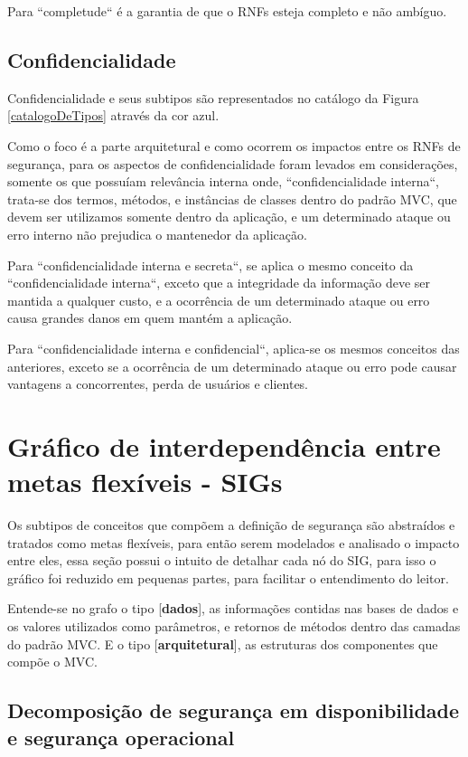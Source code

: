 Para ``completude`` é a garantia de que o RNFs esteja completo e não ambíguo.

\subsection{Confidencialidade}

Confidencialidade e seus subtipos são representados no catálogo da Figura \ref{catalogoDeTipos} através da cor azul. 

Como o foco é a parte arquitetural e como ocorrem os impactos entre os RNFs de segurança, para os aspectos de confidencialidade foram levados em considerações, somente os que possuíam relevância interna onde, ``confidencialidade interna``, trata-se dos termos, métodos, e instâncias de classes dentro do padrão MVC, que devem ser utilizamos somente dentro da aplicação, e um determinado ataque ou erro interno não prejudica o mantenedor da aplicação.

Para ``confidencialidade interna e secreta``, se aplica o mesmo conceito da ``confidencialidade interna``, exceto que a integridade da informação deve ser mantida a qualquer custo, e a ocorrência de um determinado ataque ou erro causa grandes danos em quem mantém a aplicação.

Para ``confidencialidade interna e confidencial``, aplica-se os mesmos conceitos das anteriores, exceto se a ocorrência de um determinado ataque ou erro pode causar vantagens a concorrentes, perda de usuários e clientes. 

\pagebreak

\section{Gráfico de interdependência entre metas flexíveis - SIGs}

Os subtipos de conceitos que compõem a definição de segurança são abstraídos e tratados como metas flexíveis, para então serem modelados e analisado o impacto entre eles, essa seção possui o intuito de detalhar cada nó do SIG, para isso o gráfico foi reduzido em pequenas partes, para facilitar o entendimento do leitor.

Entende-se no grafo o tipo [\textbf{dados}], as informações contidas nas bases de dados e os valores utilizados como parâmetros, e retornos de métodos dentro das camadas do padrão MVC. E o tipo [\textbf{arquitetural}], as estruturas dos componentes que compõe o MVC. 

\subsection{Decomposição de segurança em disponibilidade e segurança operacional}
\label{sub:DecomposicaoDeSegurancaEmDisponibilidadeESeguranca}

